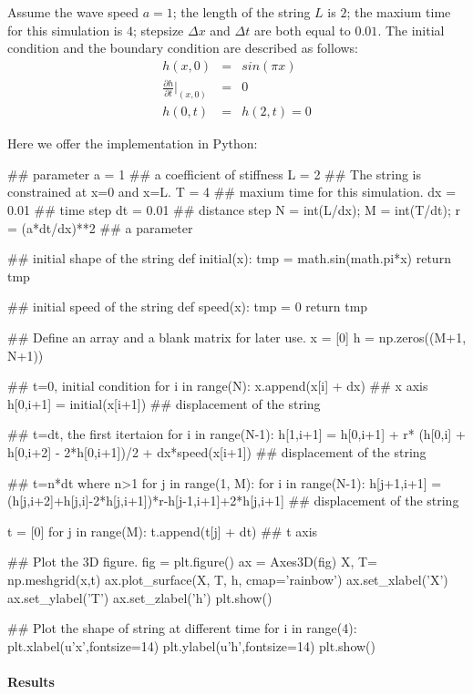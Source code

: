 Assume the wave speed $a = 1$; the length of the string $L$ is $2$; the maxium time for this simulation is $4$; stepsize $\Delta x$ and $\Delta t$ are both equal to $0.01$. The initial condition and the boundary condition are described as follows:
\begin{eqnarray}
h(x,0)&=&sin(\pi x)\\
\frac{\partial h}{\partial t}\bigg |_{(x,0)}&=&0\\
h(0,t)&=&h(2,t)=0
\end{eqnarray}

Here we offer the implementation in Python:

\begin{python}
	## parameter
	a = 1  ## a coefficient of stiffness
	L = 2  ## The string is constrained at x=0 and x=L.
	T = 4  ## maxium time for this simulation.
	dx = 0.01  ## time step
	dt = 0.01  ## distance step
	N = int(L/dx);
	M = int(T/dt);
	r = (a*dt/dx)**2  ## a parameter

	## initial shape of the string
	def initial(x):
	tmp = math.sin(math.pi*x)
	return tmp
	
	## initial speed of the string
	def speed(x):
	tmp = 0
	return tmp
	
	## Define an array and a blank matrix for later use.
	x = [0]
	h = np.zeros((M+1, N+1))
	
	## t=0, initial condition
	for i in range(N):
	x.append(x[i] + dx)  ## x axis
	h[0,i+1] = initial(x[i+1])  ## displacement of the string
	
	## t=dt, the first itertaion
	for i in range(N-1):
	h[1,i+1] = h[0,i+1] + r* (h[0,i] + h[0,i+2] - 2*h[0,i+1])/2 + dx*speed(x[i+1])
	## displacement of the string
	
	## t=n*dt where n>1
	for j in range(1, M):
	for i in range(N-1):
	h[j+1,i+1] = (h[j,i+2]+h[j,i]-2*h[j,i+1])*r-h[j-1,i+1]+2*h[j,i+1]
	## displacement of the string
	
	t = [0]
	for j in range(M):
	t.append(t[j] + dt)  ## t axis
	
	## Plot the 3D figure.
	fig = plt.figure()
	ax = Axes3D(fig)
	X, T= np.meshgrid(x,t)
	ax.plot_surface(X, T, h, cmap='rainbow')
	ax.set_xlabel('X')
	ax.set_ylabel('T')
	ax.set_zlabel('h')
	plt.show()
	
	## Plot the shape of string at different time
	for i in range(4):
	plt.xlabel(u'x',fontsize=14)
	plt.ylabel(u'h',fontsize=14)
	plt.show()
\end{python}

\paragraph{Results}

